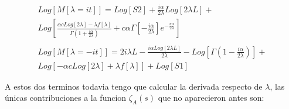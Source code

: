 \begin{equation}
\begin{array}{c}
Log[M[\lambda = i t]] = 
Log[S2] +
\frac{i \alpha}{2 \lambda} Log[2 \lambda L] +  \\
Log[
	\frac{\alpha c Log[2 \lambda] - \lambda f[\lambda] }{\Gamma (1 + \frac{i \alpha}{ 2 \lambda})} + 
	c \alpha \Gamma \left[- \frac{i \alpha}{2 \lambda} \right] 
	e ^{- \frac{ \pi \alpha}{2 \lambda}} ] \\ \\
	
Log[M[\lambda = - i t]] = 
2 i \lambda L -
\frac{i \alpha Log[2 \lambda L]}{2 \lambda} -
Log[\Gamma (1- \frac{i \alpha}{2 \lambda}) ] + \\
Log[
	- \alpha c Log[2 \lambda] +
	\lambda f[\lambda]
	] +
Log[S1]
\end{array}
\end{equation}


A estos dos terminos todavia tengo que calcular la derivada respecto de $\lambda$, las únicas contribuciones a la funcion $\zeta _A (s)$ que no aparecieron antes son:


\begin{comment}
\textbf{Log[S2]:} \\

S2 es una serie de potencias que tiende a 1 en $\lambda \rightarrow \infty$, entonces tiene la forma:

\begin{equation}
S2 = 1 + \sum _{n=1} ^{\infty} \frac{a _n}{\lambda ^n}
\end{equation}

Debido a que $S2$ tiende a $0$, puedo resarrollar su derivada logaritmica y me cambia la primer potencia que aparece, siendo $\frac{1}{\lambda ^ 2}$:


\begin{equation}
\partial _{\lambda} Log[S2] = 
\frac{
    \sum _{n=1} ^{\infty} \frac{(-n) a_n}{\lambda ^{n+1}} }{1 + \sum _{n=1} ^{\infty} \frac{a _n}{\lambda ^n} }
= \sum _{n=2} ^{\infty} \frac{b _n}{\lambda ^n}
\end{equation}

De aquí se puede ver que este termino de la suma contribuira a polos simples, en los semienteros (como pasa en el problema regular), siendo la primer contribucion en $s=-1/2$ \\

$\mathbf{
- \frac{i \alpha}{2 \lambda} Log[2 \lambda L]} : 
$ \\

Este termino es el mismo que aparecía en el problema regular, y va a contribuir a un polo doble en $s=-1/2$  \\



En La rama de abajo voy a tener dos terminos que se comportan diferente que los anteriores:

$\mathbf{
		Log[\Gamma [ 1 - \frac{i \alpha}{2 \lambda} ] ]
		}: 
		$ \\

\end{comment}

